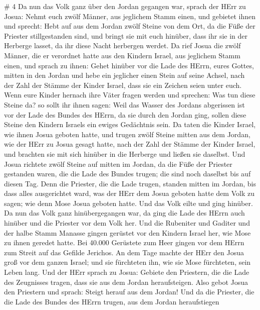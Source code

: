 \# 4  Da nun das Volk ganz über den Jordan gegangen war,
sprach der HErr zu Josua:  Nehmt euch zwölf Männer, aus
jeglichem Stamm einen,  und gebietet ihnen und sprecht: Hebt
auf aus dem Jordan zwölf Steine von dem Ort, da die Füße der Priester
stillgestanden sind, und bringt sie mit euch hinüber, dass ihr sie in
der Herberge lasset, da ihr diese Nacht herbergen werdet. 
Da rief Josua die zwölf Männer, die er verordnet hatte aus den Kindern
Israel, aus jeglichem Stamm einen,  und sprach zu ihnen:
Gehet hinüber vor die Lade des HErrn, eures Gottes, mitten in den Jordan
und hebe ein jeglicher einen Stein auf seine Achsel, nach der Zahl der
Stämme der Kinder Israel,  dass sie ein Zeichen seien unter
euch. Wenn eure Kinder hernach ihre Väter fragen werden und sprechen:
Was tun diese Steine da?  so sollt ihr ihnen sagen: Weil das
Wasser des Jordans abgerissen ist vor der Lade des Bundes des HErrn, da
sie durch den Jordan ging, sollen diese Steine den Kindern Israels ein
ewiges Gedächtnis sein.  Da taten die Kinder Israel, wie
ihnen Josua geboten hatte, und trugen zwölf Steine mitten aus dem
Jordan, wie der HErr zu Josua gesagt hatte, nach der Zahl der Stämme der
Kinder Israel, und brachten sie mit sich hinüber in die Herberge und
ließen sie daselbst.  Und Josua richtete zwölf Steine auf
mitten im Jordan, da die Füße der Priester gestanden waren, die die Lade
des Bundes trugen; die sind noch daselbst bis auf diesen Tag.
 Denn die Priester, die die Lade trugen, standen mitten im
Jordan, bis dass alles ausgerichtet ward, was der HErr dem Josua geboten
hatte dem Volk zu sagen; wie denn Mose Josua geboten hatte. Und das Volk
eilte und ging hinüber.  Da nun das Volk ganz
hinübergegangen war, da ging die Lade des HErrn auch hinüber und die
Priester vor dem Volk her.  Und die Rubeniter und Gaditer
und der halbe Stamm Manasse gingen gerüstet vor den Kindern Israel her,
wie Mose zu ihnen geredet hatte.  Bei 40.000 Gerüstete zum
Heer gingen vor dem HErrn zum Streit auf das Gefilde Jerichos.
 An dem Tage machte der HErr den Josua groß vor dem ganzen
Israel; und sie fürchteten ihn, wie sie Mose fürchteten, sein Leben
lang.  Und der HErr sprach zu Josua:  Gebiete
den Priestern, die die Lade des Zeugnisses tragen, dass sie aus dem
Jordan heraufsteigen.  Also gebot Josua den Priestern und
sprach: Steigt herauf aus dem Jordan!  Und da die Priester,
die die Lade des Bundes des HErrn trugen, aus dem Jordan heraufstiegen
